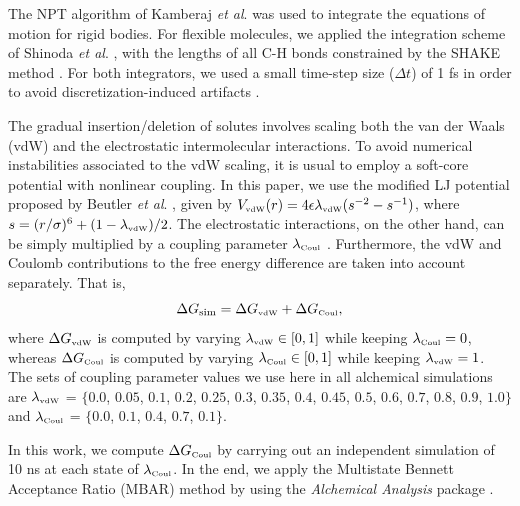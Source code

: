 \documentclass[3p,twocolumn]{elsarticle}
\begin{document}
The NPT algorithm of Kamberaj \textit{et al}. \cite{Kamberaj_2005} was used to integrate the equations of motion for rigid bodies.
For flexible molecules, we applied the integration scheme of Shinoda \textit{et al}. \cite{Shinoda2004}, with the lengths of all C-H bonds constrained by the SHAKE method \cite{Ryckaert1977}.
For both integrators, we used a small time-step size ($\Delta t$) of 1 fs in order to avoid discretization-induced artifacts \cite{Eastwood_2010, Silveira_2017}.

The gradual insertion/deletion of solutes involves scaling both the van der Waals (vdW) and the electrostatic intermolecular interactions.
To avoid numerical instabilities associated to the vdW scaling, it is usual to employ a soft-core potential with nonlinear coupling.
In this paper, we use the modified LJ potential proposed by Beutler \textit{et al}. \cite{Beutler_1994}, given by $V_\text{\tiny vdW}(r) = 4 \epsilon \lambda_\text{\tiny vdW} (s^{-2} - s^{-1})$, where $s = (r/\sigma)^6 + (1 - \lambda_\text{\tiny vdW})/2$.
The electrostatic interactions, on the other hand, can be simply multiplied by a coupling parameter $\lambda_\text{\tiny Coul}$ \cite{Naden_2015}.
Furthermore, the vdW and Coulomb contributions to the free energy difference are taken into account separately.
That is,
\begin{equation}
\Delta G_\text{sim} = \Delta G_\text{\tiny vdW} + \Delta G_\text{\tiny Coul},
\end{equation}
where $\Delta G_\text{\tiny vdW}$ is computed by varying $\lambda_\text{\tiny vdW} \in [0,1]$ while keeping $\lambda_\text{\tiny Coul} = 0$, whereas $\Delta G_\text{\tiny Coul}$ is computed by varying $\lambda_\text{\tiny Coul} \in [0,1]$ while keeping $\lambda_\text{\tiny vdW} = 1$.
The sets of coupling parameter values we use here in all alchemical simulations are $\lambda_{\text{\tiny vdW}}$ = $\{0.0$, $0.05$, $0.1$, $0.2$, $0.25$, $0.3$, $0.35$, $0.4$, $0.45$, $0.5$, $0.6$, $0.7$, $0.8$, $0.9$, $1.0\}$ and $\lambda_{\text{\tiny Coul}}$ = $\{0.0$, $0.1$, $0.4$, $0.7$, $0.1\}$.

In this work, we compute $\Delta G_\text{\tiny Coul}$ by carrying out an independent simulation of 10 ns at each state of $\lambda_{\text{\tiny Coul}}$.
In the end, we apply the Multistate Bennett Acceptance Ratio (MBAR) method \cite{Shirts_2008} by using the \textit{Alchemical Analysis} package \cite{Klimovich_2015}.
\end{document}
